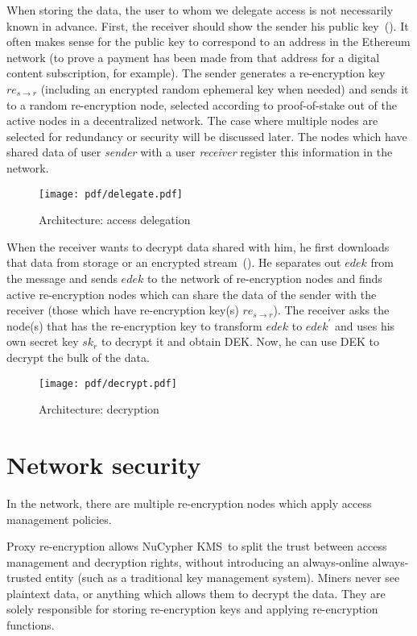 \documentclass[longbibliography,nofootinbib]{revtex4-1}
\newcommand{\kms}{NuCypher KMS}
\begin{document}
\begin{CJK*}{UTF8}{gbsn}
When storing the data, the user to whom we delegate access is not necessarily known in advance.
First, the receiver should show the sender his public key~().
It often makes sense for the public key to correspond to an address in the Ethereum network (to prove a payment has been made from that
address for a digital content subscription, for example).
The sender generates a re-encryption key $re_{s\rightarrow r}$ (including an encrypted random ephemeral key when needed) and sends it to a random re-encryption
node, selected according to proof-of-stake out of the active nodes in a decentralized network.
The case where multiple nodes are selected for redundancy or security will be discussed later.
The nodes which have shared data of user \emph{sender} with a user \emph{receiver} register this information in the network.
\begin{figure}
\centering
    \texttt{[image: pdf/delegate.pdf]}
    \caption{Architecture: access delegation}
    \label{fig:arch-delegate}
\end{figure}

When the receiver wants to decrypt data shared with him, he first downloads that data from storage or an encrypted stream~().
He separates out $edek$ from the message and sends $edek$ to the network of re-encryption nodes and finds active re-encryption nodes which can share the data
of the sender with the receiver (those which have re-encryption key(s) $re_{s\rightarrow r}$).
The receiver asks the node(s) that has the re-encryption key to transform $edek$ to $edek^{\prime}$ and uses his own secret key $sk_r$ to decrypt it and
obtain DEK.
Now, he can use DEK to decrypt the bulk of the data.
\begin{figure}
\centering
    \texttt{[image: pdf/decrypt.pdf]}
    \caption{Architecture: decryption}
    \label{fig:arch-decrypt}
\end{figure}

\section{Network security}

In the network, there are multiple re-encryption nodes which apply access management policies.

Proxy re-encryption allows \kms~to split the trust between access management and decryption rights,
without introducing an always-online always-trusted entity (such as a traditional key management system).
Miners never see plaintext data, or anything which allows them to decrypt the data.
They are solely responsible for storing re-encryption keys and applying re-encryption functions.


\end{CJK*}
\end{document}
